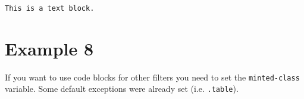 \begin{verbatim}
This is a text block.
\end{verbatim}

\section{Example 8}\label{example-8}

If you want to use code blocks for other filters you need to set the
\texttt{minted-class} variable. Some default exceptions were
already set (i.e. \texttt{.table}).

\begin{verbatim}
\end{verbatim}
